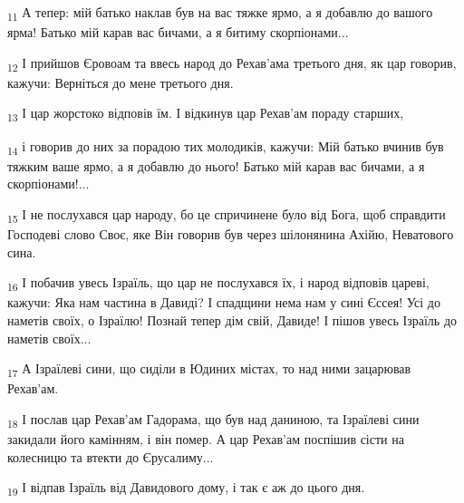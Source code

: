 \begin{tcolorbox}
\textsubscript{11} А тепер: мій батько наклав був на вас тяжке ярмо, а я добавлю до вашого ярма! Батько мій карав вас бичами, а я битиму скорпіонами...
\end{tcolorbox}
\begin{tcolorbox}
\textsubscript{12} І прийшов Єровоам та ввесь народ до Рехав'ама третього дня, як цар говорив, кажучи: Верніться до мене третього дня.
\end{tcolorbox}
\begin{tcolorbox}
\textsubscript{13} І цар жорстоко відповів їм. І відкинув цар Рехав'ам пораду старших,
\end{tcolorbox}
\begin{tcolorbox}
\textsubscript{14} і говорив до них за порадою тих молодиків, кажучи: Мій батько вчинив був тяжким ваше ярмо, а я добавлю до нього! Батько мій карав вас бичами, а я скорпіонами!...
\end{tcolorbox}
\begin{tcolorbox}
\textsubscript{15} І не послухався цар народу, бо це спричинене було від Бога, щоб справдити Господеві слово Своє, яке Він говорив був через шілонянина Ахійю, Неватового сина.
\end{tcolorbox}
\begin{tcolorbox}
\textsubscript{16} І побачив увесь Ізраїль, що цар не послухався їх, і народ відповів цареві, кажучи: Яка нам частина в Давиді? І спадщини нема нам у сині Єссея! Усі до наметів своїх, о Ізраїлю! Познай тепер дім свій, Давиде! І пішов увесь Ізраїль до наметів своїх...
\end{tcolorbox}
\begin{tcolorbox}
\textsubscript{17} А Ізраїлеві сини, що сиділи в Юдиних містах, то над ними зацарював Рехав'ам.
\end{tcolorbox}
\begin{tcolorbox}
\textsubscript{18} І послав цар Рехав'ам Гадорама, що був над даниною, та Ізраїлеві сини закидали його камінням, і він помер. А цар Рехав'ам поспішив сісти на колесницю та втекти до Єрусалиму...
\end{tcolorbox}
\begin{tcolorbox}
\textsubscript{19} І відпав Ізраїль від Давидового дому, і так є аж до цього дня.
\end{tcolorbox}
